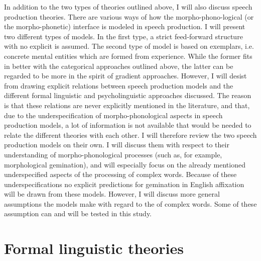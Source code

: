 In addition to the two types of theories outlined above, I will also discuss speech production theories. There are various ways of how the morpho-phono-logical (or the morpho-phonetic) interface is modeled in speech production.  
I will present two different types of models. In the first type, a strict feed-forward structure with no explicit  is assumed. The second type of model is based on exemplars, i.e. concrete mental entities which are formed from experience. While the former fits in better with the categorical approaches outlined above, the latter can be regarded to be more in the spirit of gradient approaches. 
However, I will desist from drawing explicit relations between speech production models and the different formal linguistic and psycholinguistic approaches discussed. The reason is that these relations are never explicitly mentioned in the literature, and that, due to the underspecification of morpho-phonological aspects in speech production models, a lot of information is not available that would be needed to relate the different theories with each other.
I will therefore review the two speech production models on their own. I will discuss them with respect to their understanding of morpho-phonological processes (such as, for example, {morphological gemination}), and will especially focus on the already mentioned underspecified aspects of the processing of complex words.  Because of these underspecifications no explicit predictions for {gemination} in English {affixation} will be drawn from these models. However, I will discuss more general assumptions the models make with regard to the  of complex words. Some of these assumption can and will be tested in this study.



\section{Formal linguistic theories} 

